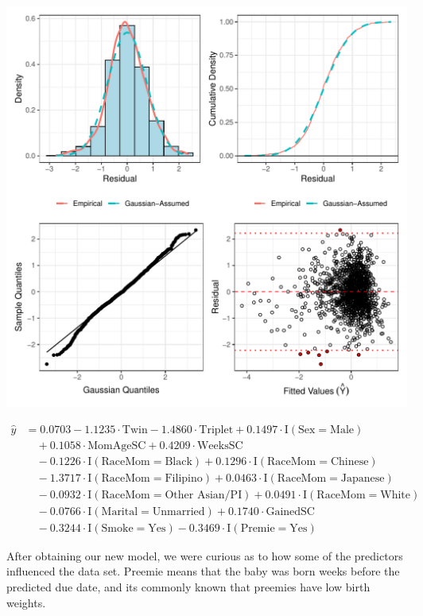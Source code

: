 \documentclass{article}\usepackage[]{graphicx}\usepackage[]{xcolor}
\makeatletter
\def\maxwidth{ %
  \ifdim\Gin@nat@width>\linewidth
    \linewidth
  \else
    \Gin@nat@width
  \fi
}
\newenvironment{knitrout}{}{} %
\makeatother
\begin{document}
\begin{knitrout}
\includegraphics[width=\maxwidth]{figure/unnamed-chunk-12-1} 
\end{knitrout}

\begin{align*} 
\hat{y} &= 0.0703 -1.1235\cdot \text{Twin} -1.4860\cdot \text{Triplet} + 0.1497\cdot \text{I}(\text{Sex} = \text{Male}) \\ &\quad + 0.1058\cdot \text{MomAgeSC} + 0.4209\cdot \text{WeeksSC} \\ &\quad -0.1226\cdot \text{I}(\text{RaceMom} = \text{Black}) + 0.1296\cdot \text{I}(\text{RaceMom} = \text{Chinese}) \\ &\quad -1.3717\cdot \text{I}(\text{RaceMom} = \text{Filipino}) + 0.0463\cdot \text{I}(\text{RaceMom} = \text{Japanese}) \\ &\quad -0.0932\cdot \text{I}(\text{RaceMom} = \text{Other\ Asian/PI}) + 0.0491\cdot \text{I}(\text{RaceMom} = \text{White}) \\ &\quad -0.0766\cdot \text{I}(\text{Marital} = \text{Unmarried}) + 0.1740\cdot \text{GainedSC} \\ &\quad -0.3244\cdot \text{I}(\text{Smoke} = \text{Yes}) -0.3469\cdot \text{I}(\text{Premie} = \text{Yes}) 
\end{align*}

After obtaining our new model, we were curious as to how some of the predictors influenced the data set. Preemie means that the baby was born weeks before the predicted due date, and its commonly known that preemies have low birth weights. 
\end{document}
